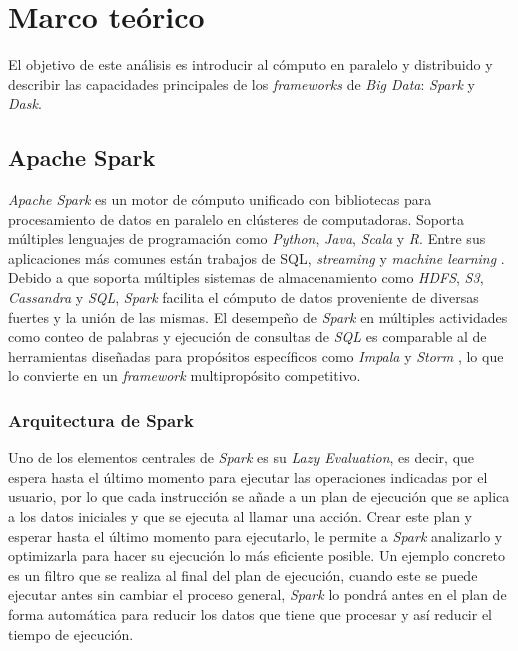 \chapter{Marco teórico}

\noindent El objetivo de este análisis es introducir al cómputo en paralelo y distribuido y describir las capacidades principales de los \textit{frameworks}  de \textit{Big Data}: \textit{Spark} y \textit{Dask}.

\section{Apache Spark}

\textit{Apache Spark} es un motor de cómputo unificado con bibliotecas para procesamiento de datos en paralelo en clústeres de computadoras. Soporta múltiples lenguajes de programación como \textit{Python}, \textit{Java}, \textit{Scala} y \textit{R}. Entre sus aplicaciones más comunes están trabajos de SQL, \textit{streaming} y \textit{machine learning} \cite{sparkguide}. Debido a que soporta múltiples sistemas de almacenamiento como \textit{HDFS}, \textit{S3}, \textit{Cassandra} y \textit{SQL}, \textit{Spark} facilita el cómputo de datos proveniente de diversas fuertes y la unión de las mismas. El desempeño de \textit{Spark} en múltiples actividades como conteo de palabras y ejecución de consultas de \textit{SQL} es comparable al de herramientas diseñadas para propósitos específicos como \textit{Impala} y \textit{Storm} \cite{sparkberkeley}, lo que lo convierte en un \textit{framework} multipropósito competitivo.

\subsection{Arquitectura de Spark}

Uno de los elementos centrales de \textit{Spark} es su \textit{Lazy Evaluation}, es decir, que espera hasta el último momento para ejecutar las operaciones indicadas por el usuario, por lo que cada instrucción se añade a un plan de ejecución que se aplica a los datos iniciales y que se ejecuta al llamar una acción. Crear este plan y esperar hasta el último momento para ejecutarlo, le permite a \textit{Spark} analizarlo y optimizarla para hacer su ejecución lo más eficiente posible. Un ejemplo concreto es un filtro que se realiza al final del plan de ejecución, cuando este se puede ejecutar antes sin cambiar el proceso general, \textit{Spark} lo pondrá antes en el plan de forma automática para reducir los datos que tiene que procesar y así reducir el tiempo de ejecución.

